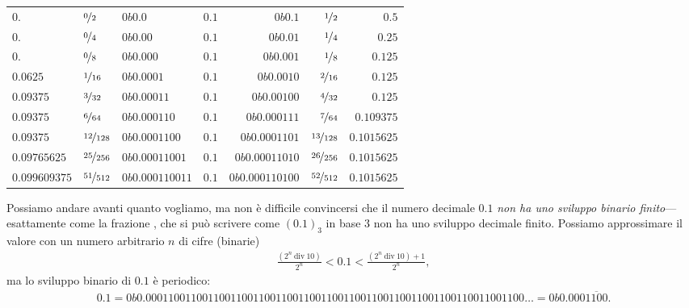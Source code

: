 \begin{center}
  \begin{tabular}{lllcrrr}
  $0.$ & $\nicefrac{0}{2}$ & $0b0.0$ & $0.1$ & $0b0.1$ & $\nicefrac{1}{2}$ & $0.5$\\
  $0.$ & $\nicefrac{0}{4}$ & $0b0.00$ & $0.1$ & $0b0.01$ & $\nicefrac{1}{4}$ & $0.25$\\
  $0.$ & $\nicefrac{0}{8}$ & $0b0.000$ & $0.1$ & $0b0.001$ & $\nicefrac{1}{8}$ & $0.125$\\
  $0.0625$ & $\nicefrac{1}{16}$ & $0b0.0001$ & $0.1$ & $0b0.0010$ & $\nicefrac{2}{16}$ & $0.125$\\
  $0.09375$ & $\nicefrac{3}{32}$ & $0b0.00011$ & $0.1$ & $0b0.00100$ & $\nicefrac{4}{32}$ & $0.125$\\
  $0.09375$ & $\nicefrac{6}{64}$ & $0b0.000110$ & $0.1$ & $0b0.000111$ & $\nicefrac{7}{64}$ & $0.109375$\\
  $0.09375$ & $\nicefrac{12}{128}$ & $0b0.0001100$ & $0.1$ & $0b0.0001101$ & $\nicefrac{13}{128}$ & $0.1015625$\\
  $0.09765625$ & $\nicefrac{25}{256}$ & $0b0.00011001$ & $0.1$ & $0b0.00011010$ & $\nicefrac{26}{256}$ & $0.1015625$\\
  $0.099609375$ & $\nicefrac{51}{512}$ & $0b0.000110011$ & $0.1$ & $0b0.000110100$ & $\nicefrac{52}{512}$ & $0.1015625$\\
  \end{tabular}
\end{center}
Possiamo andare avanti quanto vogliamo, ma non è difficile convincersi che
il numero decimale $0.1$ \emph{non ha uno sviluppo binario finito}---esattamente
come la frazione , che si può scrivere come $(0.1)_3$ in base
$3$ non ha uno sviluppo decimale finito. Possiamo approssimare il valore con un
numero arbitrario $n$ di cifre (binarie)
\begin{align*}
  \frac{(2^n~\text{div}~10)}{2^n} < 0.1 <   \frac{(2^n~\text{div}~10) + 1}{2^n},
\end{align*}
ma lo sviluppo binario di $0.1$ è periodico:
\begin{align*}
  0.1 = 0b0.0001100110011001100110011001100110011001100110011001100110011001100
  \ldots = 0b0.000\overline{1100}.
\end{align*}


